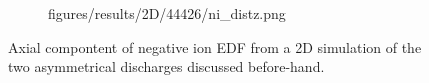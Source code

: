 \begin{center}
\begin{figure}
\begin{subfigure}{0.49\textwidth}
                        {figures/results/2D/44426/ni_distz.png}
                \end{subfigure}
                \caption[Axial negative ion EDF from 2D]{%
                    Axial compontent of negative ion EDF from a 2D simulation %
										of the two asymmetrical discharges discussed before-hand.}
                \label{fig:app_edf_ni}
            \end{figure}
        \end{center}
%
		\clearpage
    \listoffigures %
	\listoftables %
